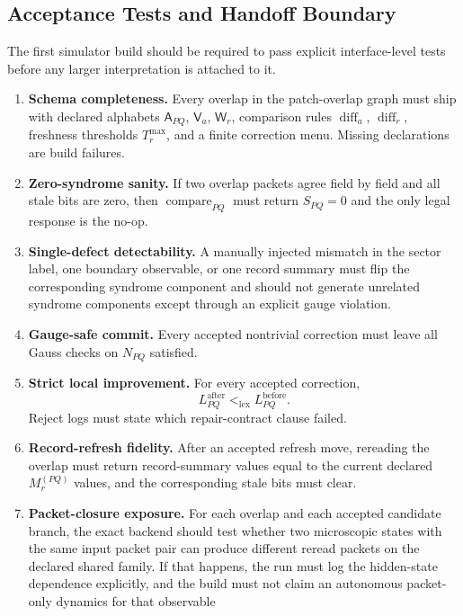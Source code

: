 \documentclass[11pt]{article}
\begin{document}
\subsection{Acceptance Tests and Handoff Boundary}

The first simulator build should be required to pass explicit interface-level tests before any
larger interpretation is attached to it.
\begin{enumerate}[leftmargin=2em]
\item \textbf{Schema completeness.}
Every overlap in the patch-overlap graph must ship with declared alphabets $\mathsf A_{PQ}$,
$\mathsf V_a$, $\mathsf W_r$, comparison rules $\operatorname{diff}_a$, $\operatorname{diff}_r$,
freshness thresholds $T_r^{\max}$, and a finite correction menu. Missing declarations are build
failures.
\item \textbf{Zero-syndrome sanity.}
If two overlap packets agree field by field and all stale bits are zero, then
$\operatorname{compare}_{PQ}$ must return $S_{PQ}=0$ and the only legal response is the no-op.
\item \textbf{Single-defect detectability.}
A manually injected mismatch in the sector label, one boundary observable, or one record summary
must flip the corresponding syndrome component and should not generate unrelated syndrome
components except through an explicit gauge violation.
\item \textbf{Gauge-safe commit.}
Every accepted nontrivial correction must leave all Gauss checks on $N_{PQ}$ satisfied.
\item \textbf{Strict local improvement.}
For every accepted correction,
\begin{equation}
L_{PQ}^{\mathrm{after}} <_{\mathrm{lex}} L_{PQ}^{\mathrm{before}}.
\end{equation}
Reject logs must state which repair-contract clause failed.
\item \textbf{Record-refresh fidelity.}
After an accepted refresh move, rereading the overlap must return record-summary values equal to
the current declared $M_r^{(PQ)}$ values, and the corresponding stale bits must clear.
\item \textbf{Packet-closure exposure.}
For each overlap and each accepted candidate branch, the exact backend should test whether two
microscopic states with the same input packet pair can produce different reread packets on the
declared shared family. If that happens, the run must log the hidden-state dependence
explicitly, and the build must not claim an autonomous packet-only dynamics for that observable

\end{enumerate}
\end{document}

